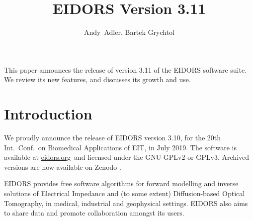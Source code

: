 \documentclass[10pt,letterpaper]{article}
\title{EIDORS Version 3.11%
\vspace{-2ex}} %
\author{Andy~Adler, Bartek Grychtol}
\affil{Carleton University, Ottawa, Canada}
\date{}
\begin{document}
\maketitle
\vspace{-1.5cm}
\thispagestyle{empty}


This paper announces the release of version 3.11 of the
EIDORS software suite. We review its new features, and 
discusses its growth and use.

\section{Introduction}
We proudly announce the release of EIDORS version 3.10,
for the 20th Int.\ Conf.\ on Biomedical Applications of EIT,
in July 2019.
The software is available at \href{www.eidors.org}{eidors.org}\, and licensed under the GNU GPLv2 or GPLv3. Archived versions are now available on Zenodo
\cite{eidors3p10,
      eidors3p9p1,
      eidors3p9,
      eidors3p8}.


EIDORS provides free software algorithms for forward modelling
and inverse solutions
of Electrical Impedance and (to some extent) Diffusion-based Optical Tomography, in
medical, industrial and geophysical settings.
EIDORS also aims to share data and promote
collaboration amongst its users.
\end{document}
